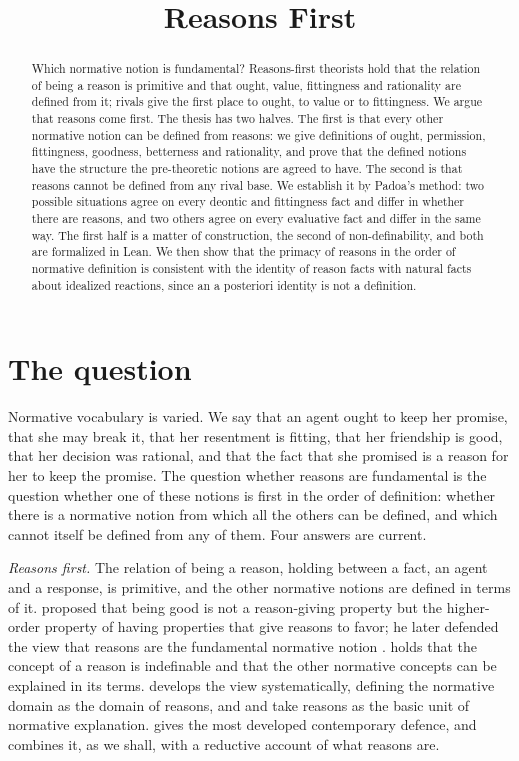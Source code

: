 \documentclass{situationist-preprint}
\title{Reasons First}
\begin{document}
\maketitle

\begin{abstract}
Which normative notion is fundamental? Reasons-first theorists hold that the relation of being a reason is primitive and that ought, value, fittingness and rationality are defined from it; rivals give the first place to ought, to value or to fittingness. We argue that reasons come first. The thesis has two halves. The first is that every other normative notion can be defined from reasons: we give definitions of ought, permission, fittingness, goodness, betterness and rationality, and prove that the defined notions have the structure the pre-theoretic notions are agreed to have. The second is that reasons cannot be defined from any rival base. We establish it by Padoa's method: two possible situations agree on every deontic and fittingness fact and differ in whether there are reasons, and two others agree on every evaluative fact and differ in the same way. The first half is a matter of construction, the second of non-definability, and both are formalized in Lean. We then show that the primacy of reasons in the order of normative definition is consistent with the identity of reason facts with natural facts about idealized reactions, since an a posteriori identity is not a definition.
\end{abstract}

\section{The question}

Normative vocabulary is varied. We say that an agent ought to keep her promise, that she may break it, that her resentment is fitting, that her friendship is good, that her decision was rational, and that the fact that she promised is a reason for her to keep the promise. The question whether reasons are fundamental is the question whether one of these notions is first in the order of definition: whether there is a normative notion from which all the others can be defined, and which cannot itself be defined from any of them. Four answers are current.

\emph{Reasons first.} The relation of being a reason, holding between a fact, an agent and a response, is primitive, and the other normative notions are defined in terms of it. \citet{Scanlon1998} proposed that being good is not a reason-giving property but the higher-order property of having properties that give reasons to favor; he later defended the view that reasons are the fundamental normative notion \citep{Scanlon2014}. \citet{Parfit2011} holds that the concept of a reason is indefinable and that the other normative concepts can be explained in its terms. \citet{Skorupski2010} develops the view systematically, defining the normative domain as the domain of reasons, and \citet{Raz1999} and \citet{Dancy2004} take reasons as the basic unit of normative explanation. \citet{Schroeder2007,Schroeder2021} gives the most developed contemporary defence, and combines it, as we shall, with a reductive account of what reasons are.
\end{document}
